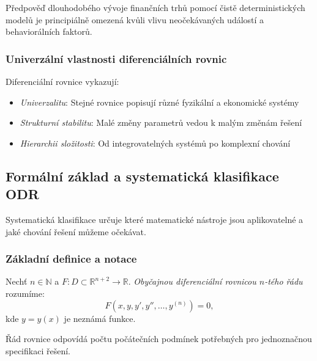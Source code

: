 \begin{example}
Předpověď dlouhodobého vývoje finančních trhů pomocí čistě deterministických modelů je principiálně omezená kvůli vlivu neočekávaných událostí a behaviorálních faktorů.
\end{example}

\subsubsection{Univerzální vlastnosti diferenciálních rovnic}

\begin{theorem}
Diferenciální rovnice vykazují:
\begin{itemize}
\item \emph{Univerzalitu}: Stejné rovnice popisují různé fyzikální a ekonomické systémy
\item \emph{Strukturní stabilitu}: Malé změny parametrů vedou k malým změnám řešení
\item \emph{Hierarchii složitosti}: Od integrovatelných systémů po komplexní chování
\end{itemize}
\end{theorem}

\spc

\subsection{Formální základ a systematická klasifikace ODR}

\begin{motivation}
Systematická klasifikace určuje které matematické nástroje jsou aplikovatelné a jaké chování řešení můžeme očekávat.
\end{motivation}

\subsubsection{Základní definice a notace}

\begin{definition}
Nechť $n \in \mathbb{N}$ a $F: D \subset \mathbb{R}^{n+2} \to \mathbb{R}$. \emph{Obyčajnou diferenciální rovnicou $n$-tého řádu} rozumíme:
\[
F\left(x, y, y', y'', \dots, y^{(n)}\right) = 0,
\]
kde $y = y(x)$ je neznámá funkce.
\end{definition}

\begin{intuition}
Řád rovnice odpovídá počtu počátečních podmínek potřebných pro jednoznačnou specifikaci řešení.
\end{intuition}

